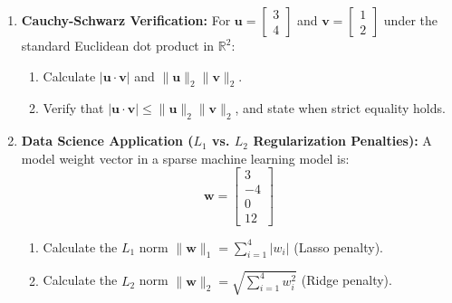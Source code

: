 \begin{enumerate}
\item \textbf{Cauchy-Schwarz Verification:} For $\mathbf{u} = \begin{bmatrix} 3 \\ 4 \end{bmatrix}$ and $\mathbf{v} = \begin{bmatrix} 1 \\ 2 \end{bmatrix}$ under the standard Euclidean dot product in $\mathbb{R}^2$:
\begin{enumerate}
    \item Calculate $|\mathbf{u} \cdot \mathbf{v}|$ and $\|\mathbf{u}\|_2 \|\mathbf{v}\|_2$.
    \item Verify that $|\mathbf{u} \cdot \mathbf{v}| \le \|\mathbf{u}\|_2 \|\mathbf{v}\|_2$, and state when strict equality holds.
\end{enumerate}

\item \textbf{Data Science Application ($L_1$ vs. $L_2$ Regularization Penalties):} A model weight vector in a sparse machine learning model is:
\begin{equation*}
\mathbf{w} = \begin{bmatrix} 3 \\ -4 \\ 0 \\ 12 \end{bmatrix}
\end{equation*}
\begin{enumerate}
    \item Calculate the $L_1$ norm $\|\mathbf{w}\|_1 = \sum_{i=1}^4 |w_i|$ (Lasso penalty).
    \item Calculate the $L_2$ norm $\|\mathbf{w}\|_2 = \sqrt{\sum_{i=1}^4 w_i^2}$ (Ridge penalty).
\end{enumerate}
\end{enumerate}

